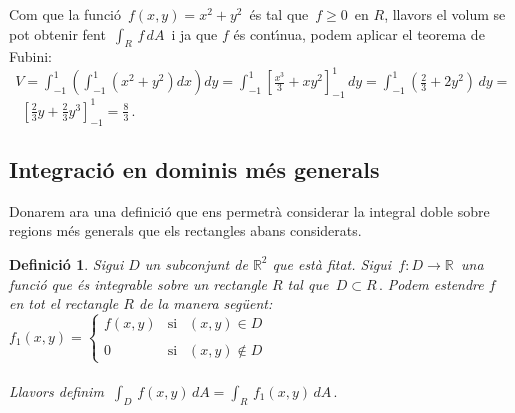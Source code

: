 \documentclass[12pt]{article}
\newtheorem{definicio}{Definici{\'o}}[subsection]
\newcommand{\R}{\mathbb{R}}
\begin{document}
\vspace*{1cm}

Com que la funci{\'o} $\, f(x,y)=x^2+y^2\, $ {\'e}s tal que $\, f\geq 0\, $
en $R$, llavors el volum se pot obtenir fent $\, \displaystyle\int_R
\, f\, dA\, $ i ja que $f$ {\'e}s cont{\'\i}nua, podem aplicar el teorema de
Fubini:\\

\vspace{0.4cm}
\hspace*{1cm}$\displaystyle\ \
V=\int_{-1}^1\left(\int_{-1}^1(x^2+y^2)dx\right)dy=
\int_{-1}^1\left[\frac{x^3}{3} +x
y^2\right]_{-1}^1\,dy=\int_{-1}^1(\frac{2}{3}
+2y^2)\,dy=$\\

\vspace{0.4cm}
\hspace*{1cm}$\displaystyle\ \ \ \ \left[\frac{2}{3}y
+\frac{2}{3}y^3\right]_{-1}^1=\frac{8}{3}\,.$

\vspace*{1cm}
\subsection{Integraci{\'o} en dominis m{\'e}s generals}

Donarem ara una definici{\'o} que ens permetr{\`a} considerar la integral
doble sobre regions m{\'e}s generals que els rectangles abans
considerats.

\begin{definicio}
Sigui $D$ un subconjunt de $\R^2$ que est{\`a} fitat. Sigui
$\,f:D\to\R\,$ una funci{\'o} que {\'e}s integrable sobre un rectangle $R$
tal que $\,D\subset R\,.$ Podem estendre $f$ en tot el rectangle $R$
de la manera seg{\"u}ent:\\

\hspace*{3cm}$f_1(x,y)=\left\{\begin{array}{ll}
              f(x,y) & \mbox{si $\ \ (x,y)\in D$}\\
               & \\
               0  & \mbox{si $\ \ (x,y)\not\in D$}
             \end{array} \right .$\\\\

Llavors definim $\
\displaystyle\int_D\,f(x,y)\,dA=\int_R\,f_1(x,y)\,dA\,.$
\end{definicio}
\end{document}

